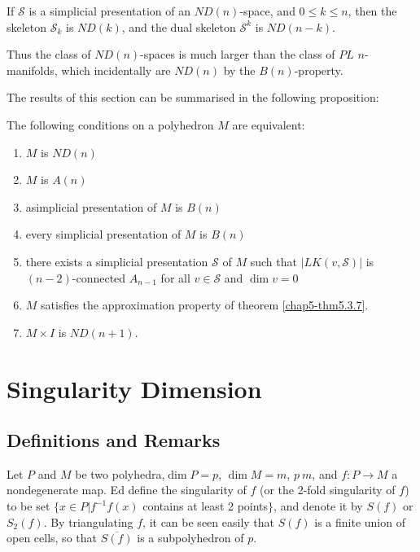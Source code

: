 \begin{exprop}\label{chap5-exprop5.3.10}
If $\mathscr{S}$ is a simplicial presentation of an $ND(n)$-space, and $0\leq k\leq n$, then the skeleton $\mathscr{S}_{k}$ is $ND(k)$, and the dual skeleton $\mathscr{S}^{k}$ is $ND(n-k)$.
\end{exprop}

Thus the class of $ND(n)$-spaces is much larger than the class of $PL$ $n$-manifolds, which incidentally are $ND(n)$ by the $B(n)$-property.

The results of this section can be summarised in the following proposition:

\begin{proposition}\label{chap5-prop5.3.11}
The following conditions on a polyhedron $M$ are equivalent:
\begin{enumerate}
\renewcommand{\labelenumi}{\rm(\theenumi)}
\item $M$ is $ND(n)$

\item $M$ is $A(n)$

\item a\pageoriginale simplicial presentation of $M$ is $B(n)$

\item every simplicial presentation of $M$ is $B(n)$

\item there exists a simplicial presentation $\mathscr{S}$ of $M$ such that $|LK(v,\mathscr{S})|$ is $(n-2)$-connected $A_{n-1}$ for all $v\in \mathscr{S}$ and $\dim v=0$

\item $M$ satisfies the approximation property of theorem \ref{chap5-thm5.3.7}. 

\item $M\times I$ is $ND(n+1)$.
\end{enumerate}
\end{proposition}

\section{Singularity Dimension}\label{chap5-sec5.4}

\subsection{Definitions and Remarks}\label{chap5-sec5.4.1}
Let $P$ and $M$ be two polyhedra,\break $\dim P=p$, $\dim M=m$, $p\ m$, and $f:P\to M$  a nondegenerate map. Ed define the singularity of $f$ (or the 2-fold singularity of $f$) to be set $\{x\in P|f^{-1}f(x)$ contains at least 2 points$\}$, and denote it by $S(f)$ or $S_{2}(f)$. By triangulating $f$, it can be seen easily that $S(f)$ is a finite union of open cells, so that $\overline{S(f)}$ is a subpolyhedron of $p$.


